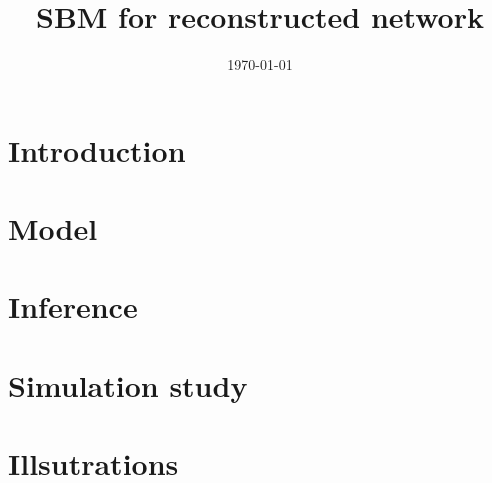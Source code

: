 \documentclass[a4paper]{article}
\begin{document}
\title{SBM for reconstructed network}

\author{} 

\date{\today}
\maketitle

\tableofcontents

\newpage \section{Introduction}

\newpage \section{Model}


\newpage \section{Inference}


\newpage \section{Simulation study}


\newpage \section{Illsutrations}


\appendix

\end{document}
